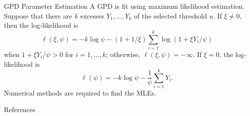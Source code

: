 \documentclass{beamer}
\begin{document}
\begin{frame}{GPD Parameter Estimation}
    A GPD is fit using maximum likelihood estimation. Suppose that there are $k$ excesses $Y_1, \ldots, Y_k$ of the selected threshold $u$. If $\xi \ne 0$, then the log-likelihood is
    \[
    \ell(\xi, \psi) = -k\log\psi - (1 + 1 / \xi)\sum_{i = 1}^k \log(1 + \xi Y_i / \psi)
    \]
    when $1 + \xi Y_i / \psi > 0$ for $i = 1, \ldots, k$; otherwise, $\ell(\xi, \psi) = -\infty$. If $\xi = 0$, the log-likelihood is
    \[
    \ell(\psi) = -k\log\psi - \frac{1}{\psi}\sum_{i = 1}^k Y_i.
    \]
    Numerical methods are required to find the MLEs.
\end{frame}

\begin{frame}{References}
    \nocite{*}
    \printbibliography
\end{frame}
\end{document}
